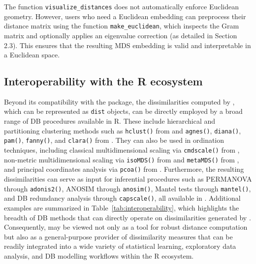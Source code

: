 The function \texttt{visualize\_distances} does not automatically enforce Euclidean geometry. However, users who need a Euclidean embedding can preprocess their distance matrix using the function \texttt{make\_euclidean}, which inspects the Gram matrix and optionally applies an eigenvalue correction (as detailed in Section 2.3).
This ensures that the resulting MDS embedding is valid and interpretable in a Euclidean space.


\subsection{Interoperability with the R ecosystem}
Beyond its compatibility with the  package, the dissimilarities computed by , which can be represented as \texttt{dist} objects, can be directly employed by a broad range of DB procedures available in R. These include hierarchical and partitioning clustering methods such as \texttt{hclust()} from  and \texttt{agnes()}, \texttt{diana()}, \texttt{pam()}, \texttt{fanny()}, and \texttt{clara()} from . They can also be used in ordination techniques, including classical multidimensional scaling via \texttt{cmdscale()} from , non-metric multidimensional scaling via \texttt{isoMDS()} from  and \texttt{metaMDS()} from , and principal coordinates analysis via \texttt{pcoa()} from  \citep{ape}. Furthermore, the resulting dissimilarities can serve as input for inferential procedures such as PERMANOVA through \texttt{adonis2()}, ANOSIM through \texttt{anosim()}, Mantel tests through \texttt{mantel()}, and DB redundancy analysis through \texttt{capscale()}, all available in . Additional examples are summarized in Table~\ref{tab:interoperability}, which highlights the breadth of DB methods that can directly operate on dissimilarities generated by . Consequently,  may be viewed not only as a tool for robust distance computation but also as a general-purpose provider of dissimilarity measures that can be readily integrated into a wide variety of statistical learning, exploratory data analysis, and DB modelling workflows within the R ecosystem.

